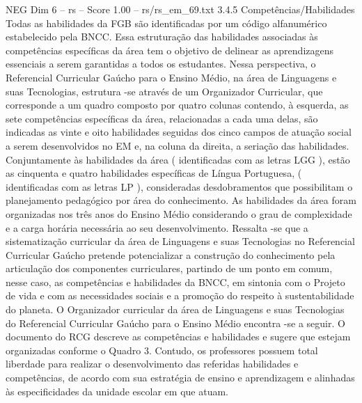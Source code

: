 \begin{textsample}{NEG Dim 6 – rs – Score 1.00 – rs/rs\_em\_69.txt}  \label{ex:f6_neg_106}
3.4.5 Competências/Habilidades Todas as habilidades da FGB são identificadas por um código alfanumérico estabelecido pela BNCC.
Essa estruturação das habilidades associadas às competências específicas da área tem o objetivo de delinear as aprendizagens essenciais a serem garantidas a todos os estudantes.
Nessa perspectiva, o Referencial Curricular Gaúcho para o Ensino Médio, na área de Linguagens e suas Tecnologias, estrutura -se através de um Organizador Curricular, que corresponde a um quadro composto por quatro colunas contendo, à esquerda, as sete competências específicas da área, relacionadas a cada uma delas, são indicadas as vinte e oito habilidades seguidas dos cinco campos de atuação social a serem desenvolvidos no EM e, na coluna da direita, a seriação das habilidades.
Conjuntamente às habilidades da área ( identificadas com as letras LGG ), estão as cinquenta e quatro habilidades específicas de Língua Portuguesa, ( identificadas com as letras LP ), consideradas desdobramentos que possibilitam o planejamento pedagógico por área do conhecimento.
As habilidades da área foram organizadas nos três anos do Ensino Médio considerando o grau de complexidade e a carga horária necessária ao seu desenvolvimento.
Ressalta -se que a sistematização curricular da área de Linguagens e suas Tecnologias no Referencial Curricular Gaúcho pretende potencializar a construção do conhecimento pela articulação dos componentes curriculares, partindo de um ponto em comum, nesse caso, as competências e habilidades da BNCC, em sintonia com o Projeto de vida e com as necessidades sociais e a promoção do respeito à sustentabilidade do planeta.
O Organizador curricular da área de Linguagens e suas Tecnologias do Referencial Curricular Gaúcho para o Ensino Médio encontra -se a seguir.
O documento do RCG descreve as competências e habilidades e sugere que estejam organizadas conforme o Quadro 3.
Contudo, os professores possuem total liberdade para realizar o desenvolvimento das referidas habilidades e competências, de acordo com sua estratégia de ensino e aprendizagem e alinhadas às especificidades da unidade escolar em que atuam.

\end{textsample}

